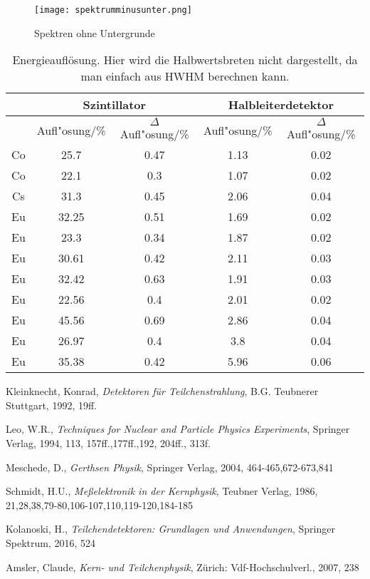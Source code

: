 \documentclass[ngerman,11pt]{article}
\begin{document}
\begin{figure}[htbp]
	\centering
	\texttt{[image: spektrumminusunter.png]}
	\caption{Spektren ohne Untergrunde}
	\label{fig:spektrummunusunter}
\end{figure}
\begin{table}[htbp]
	\centering
	\begin{tabular}{|c|c|c|c|c|}
		\hline
		&
		\multicolumn{2}{c|}{Szintillator} &
		\multicolumn{2}{c|}{Halbleiterdetektor} \\ \hline
		& {Aufl"osung/\%} &
		{$\Delta$Aufl"osung/\%} &
		{Aufl"osung/\%} &
		{$\Delta$Aufl"osung/\%} \\ \hline
		Co & 25.7  & 0.47 & 1.13 & 0.02 \\ \hline
		Co & 22.1  & 0.3  & 1.07 & 0.02 \\ \hline
		Cs & 31.3  & 0.45 & 2.06 & 0.04 \\ \hline
		Eu & 32.25 & 0.51 & 1.69 & 0.02 \\ \hline
		Eu & 23.3  & 0.34 & 1.87 & 0.02 \\ \hline
		Eu & 30.61 & 0.42 & 2.11 & 0.03 \\ \hline
		Eu & 32.42 & 0.63 & 1.91 & 0.03 \\ \hline
		Eu & 22.56 & 0.4  & 2.01 & 0.02 \\ \hline
		Eu & 45.56 & 0.69 & 2.86 & 0.04 \\ \hline
		Eu & 26.97 & 0.4  & 3.8  & 0.04 \\ \hline
		Eu & 35.38 & 0.42 & 5.96 & 0.06 \\ \hline
	\end{tabular}
\caption{Energieaufl\"osung. Hier wird die Halbwertsbreten nicht dargestellt, da man einfach aus HWHM berechnen kann.}
\label{tab:auflosung}
\end{table}
\newpage
\begin{thebibliography}{9}

	 Kleinknecht, Konrad, \textit{Detektoren für Teilchenstrahlung}, B.G. Teubnerer Stuttgart, 1992, 19ff.

	 Leo, W.R., \textit{Techniques for Nuclear and Particle Physics Experiments}, Springer Verlag, 1994, 113, 157ff.,177ff.,192, 204ff., 313f.

	 Meschede, D., \textit{Gerthsen Physik}, Springer Verlag, 2004, 464-465,672-673,841

	 Schmidt, H.U., \textit{Meßelektronik in der Kernphysik}, Teubner Verlag, 1986, 21,28,38,79-80,106-107,110,119-120,184-185

	 Kolanoski, H., \textit{Teilchendetektoren: Grundlagen und Anwendungen}, Springer Spektrum, 2016, 524

	 Amsler, Claude, \textit{Kern- und Teilchenphysik}, Zürich: Vdf-Hochschulverl., 2007, 238
\end{thebibliography}

\end{document}
